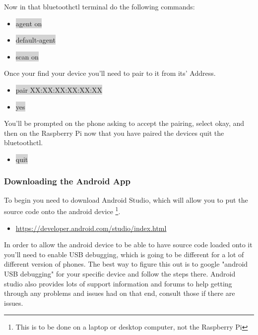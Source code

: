 \documentclass[12pt]{article}
\begin{document}
\noindent Now in that bluetoothctl terminal do the following commands:

\begin{itemize}
	\item[] \colorbox{lightgray}{agent on}
	\item[] \colorbox{lightgray}{default-agent}
	\item[] \colorbox{lightgray}{scan on}
\end{itemize}

\noindent Once your find your device you'll need to pair to it from its' Address.

\begin{itemize} 	
	\item[] \colorbox{lightgray}{pair XX:XX:XX:XX:XX:XX} 
	\item[] \colorbox{lightgray}{yes}
\end{itemize}
	
\noindent You'll be prompted on the phone asking to accept the pairing, select okay, and then on the Raspberry Pi now that you have paired the devices quit the bluetoothctl.
\begin{itemize}
	\item[] \colorbox{lightgray}{quit} 
\end{itemize}

\subsubsection{Downloading the Android App}

To begin you need to download Android Studio, which will allow you to put the source code onto the android device \footnote{This is to be done on a laptop or desktop computer, not the Raspberry Pi}.

\begin{itemize}
	\item \href{https://developer.android.com/studio/index.html}{https://developer.android.com/studio/index.html}
\end{itemize}

\noindent In order to allow the android device to be able to have source code loaded onto it you'll need to enable USB debugging, which is going to be different for a lot of different version of phones. The best way to figure this out is to google "android USB debugging" for your specific device and follow the steps there. Android studio also provides lots of support information and forums to help getting through any problems and issues had on that end, consult those if there are issues.
\end{document}
